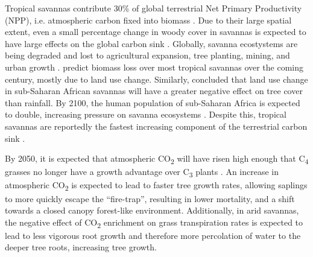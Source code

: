\begin{refsection}
Tropical savannas contribute \textapprox{}30\% of global terrestrial Net Primary Productivity (NPP), i.e. atmospheric carbon fixed into biomass \citep{Grace2006}. Due to their large spatial extent, even a small percentage change in woody cover in savannas is expected to have large effects on the global carbon sink \citep{Williams2005}. Globally, savanna ecostystems are being degraded and lost to agricultural expansion, tree planting, mining, and urban growth \citep{Parr2014}. \citet{Ross2021} predict biomass loss over most tropical savannas over the coming century, mostly due to land use change. Similarly, \citet{Aleman2016} concluded that land use change in sub-Saharan African savannas will have a greater negative effect on tree cover than rainfall. By 2100, the human population of sub-Saharan Africa is expected to double, increasing pressure on savanna ecosystems \citep{Pison2017}. Despite this, tropical savannas are reportedly the fastest increasing component of the terrestrial carbon sink \citep{Sitch2015}.

By 2050, it is expected that atmospheric CO\textsubscript{2} will have risen high enough that C\textsubscript{4} grasses no longer have a growth advantage over C\textsubscript{3} plants \citep{Bond2012}. An increase in atmospheric CO\textsubscript{2} is expected to lead to faster tree growth rates, allowing saplings to more quickly escape the ``fire-trap'', resulting in lower mortality, and a shift towards a closed canopy forest-like environment. Additionally, in arid savannas, the negative effect of CO\textsubscript{2} enrichment on grass transpiration rates \citep{Murphy2012} is expected to lead to less vigorous root growth and therefore more percolation of water to the deeper tree roots, increasing tree growth. 


\end{refsection}
